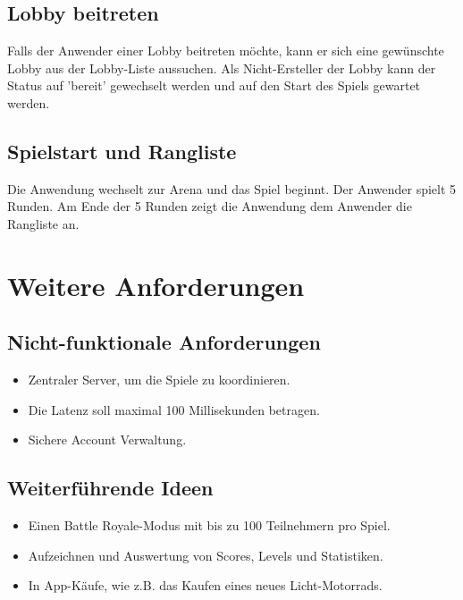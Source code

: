 \documentclass[11pt,ngerman]{article}
\begin{document}
	\subsection{\Gls{Lobby} beitreten}
	Falls der Anwender einer Lobby beitreten möchte, kann er sich eine gewünschte Lobby aus der Lobby-Liste aussuchen. Als Nicht-Ersteller der Lobby kann der Status auf 'bereit' gewechselt werden und auf den Start des Spiels gewartet werden.

	\subsection{Spielstart und Rangliste}
	Die Anwendung wechselt zur \Gls{Arena} und das Spiel beginnt. Der Anwender spielt 5 Runden. Am Ende der 5 Runden zeigt die Anwendung dem Anwender die Rangliste an.

    \section{Weitere Anforderungen}

    \subsection{Nicht-funktionale Anforderungen}
    \begin{itemize}
        \item Zentraler Server, um die Spiele zu koordinieren.
        \item Die \Gls{Latenz} soll maximal 100 Millisekunden betragen.
        \item Sichere Account Verwaltung.
    \end{itemize}

    \subsection{Weiterführende Ideen}\label{Weiterführende Ideen}
    \begin{itemize}
        \item Einen \Gls{Battle Royale}-Modus mit bis zu 100 Teilnehmern pro Spiel.
        \item Aufzeichnen und Auswertung von Scores, Levels und Statistiken.
        \item In App-Käufe, wie z.B. das Kaufen eines neues Licht-Motorrads.
    \end{itemize}
\end{document}
